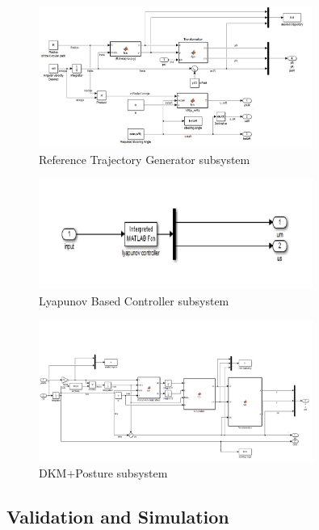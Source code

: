 \documentclass{article}
\begin{document}
\begin{figure}[H]
\centering
\includegraphics[width = 0.8\textwidth]{Figures/figure3.png}
\caption{Reference Trajectory Generator subsystem}
\label{fig:figure3}
\end{figure}

\begin{figure}[H]
\centering
\includegraphics[width = 0.8\textwidth]{Figures/figure4.png}
\caption{Lyapunov Based Controller subsystem}
\label{fig:figure4}
\end{figure}

\begin{figure}[H]
\centering
\includegraphics[width = 0.8\textwidth]{Figures/figure5.png}
\caption{DKM+Posture subsystem}
\label{fig:figure5}
\end{figure}

\subsection{Validation and Simulation}
\end{document}
